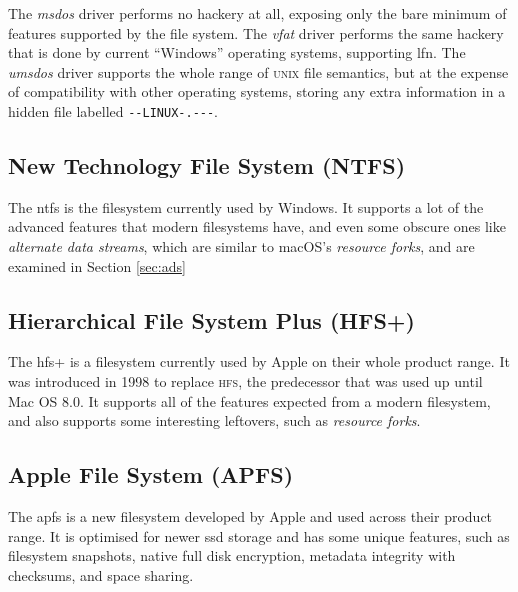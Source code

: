 \documentclass[a4paper]{article}
\begin{document}
The \emph{msdos} driver performs no hackery at all, exposing only the bare minimum of features supported by the file system. The \emph{vfat} driver performs the same hackery that is done by current “Windows” operating systems, supporting \gls{lfn}. The \emph{umsdos} driver supports the whole range of \textsc{unix} file semantics, but at the expense of compatibility with other operating systems, storing any extra information in a hidden file labelled \verb|--LINUX-.---|.

\subsection{New Technology File System (NTFS)}


The \gls{ntfs} is the filesystem currently used by Windows. It supports a lot of the advanced features that modern filesystems have, and even some obscure ones like \emph{alternate data streams}, which are similar to macOS's \emph{resource forks}, and are examined in Section \ref{sec:ads}

\subsection{Hierarchical File System Plus (HFS+)}


The \gls{hfs+} is a filesystem currently used by Apple on their whole product range. It was introduced in 1998 to replace \textsc{hfs}, the predecessor that was used up until Mac OS 8.0. It supports all of the features expected from a modern filesystem, and also supports some interesting leftovers, such as \emph{resource forks}.



\subsection{Apple File System (APFS)}

The \gls{apfs} is a new filesystem developed by Apple and used across their product range. It is optimised for newer \gls{ssd} storage and has some unique features, such as filesystem snapshots, native full disk encryption, metadata integrity with checksums, and space sharing.
\end{document}
